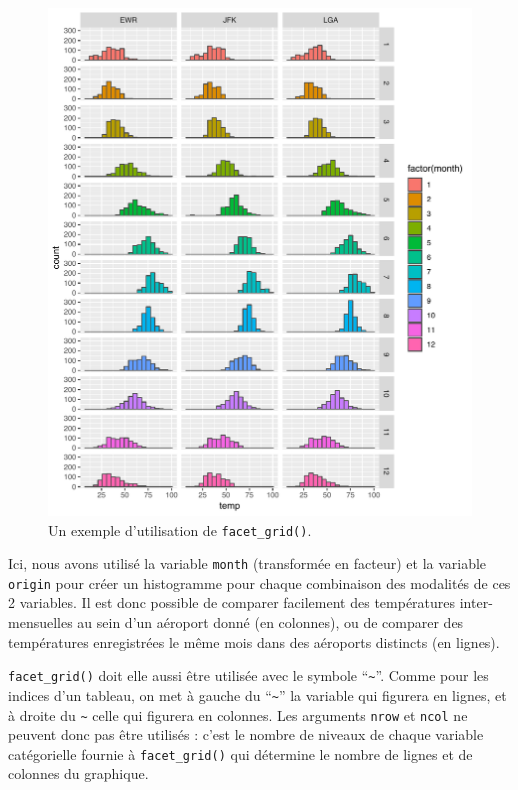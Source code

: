 \documentclass[a4paperpaper,]{article}
\begin{document}
\begin{figure}[htpb]

{\centering \includegraphics[width=0.9\linewidth]{figure/grid-1} 

}

\caption{Un exemple d'utilisation de \texttt{facet\_grid()}.}\label{fig:grid}
\end{figure}



Ici, nous avons utilisé la variable \texttt{month} (transformée en facteur) et la variable \texttt{origin} pour créer un histogramme pour chaque combinaison des modalités de ces 2 variables. Il est donc possible de comparer facilement des températures inter-mensuelles au sein d'un aéroport donné (en colonnes), ou de comparer des températures enregistrées le même mois dans des aéroports distincts (en lignes).

\texttt{facet\_grid()} doit elle aussi être utilisée avec le symbole ``\texttt{\textasciitilde{}}''. Comme pour les indices d'un tableau, on met à gauche du ``\texttt{\textasciitilde{}}'' la variable qui figurera en lignes, et à droite du \texttt{\textasciitilde{}} celle qui figurera en colonnes. Les arguments \texttt{nrow} et \texttt{ncol} ne peuvent donc pas être utilisés : c'est le nombre de niveaux de chaque variable catégorielle fournie à \texttt{facet\_grid()} qui détermine le nombre de lignes et de colonnes du graphique.
\end{document}
